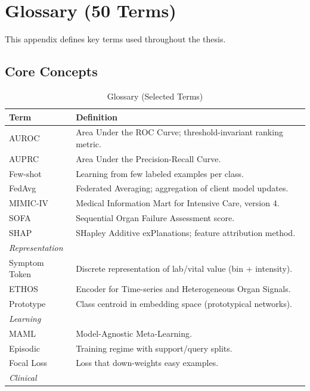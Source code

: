 \chapter{Glossary (50 Terms)}
\label{app:glossary}

This appendix defines key terms used throughout the thesis.

\section{Core Concepts}

\begin{table}[h]
\centering
\caption{Glossary (Selected Terms)}
\begin{tabular}{ll}
\toprule
Term & Definition \\
\midrule
AUROC & Area Under the ROC Curve; threshold-invariant ranking metric. \\
AUPRC & Area Under the Precision-Recall Curve. \\
Few-shot & Learning from few labeled examples per class. \\
FedAvg & Federated Averaging; aggregation of client model updates. \\
MIMIC-IV & Medical Information Mart for Intensive Care, version 4. \\
SOFA & Sequential Organ Failure Assessment score. \\
SHAP & SHapley Additive exPlanations; feature attribution method. \\
\midrule
\multicolumn{2}{l}{\textit{Representation}} \\
\midrule
Symptom Token & Discrete representation of lab/vital value (bin + intensity). \\
ETHOS & Encoder for Time-series and Heterogeneous Organ Signals. \\
Prototype & Class centroid in embedding space (prototypical networks). \\
\midrule
\multicolumn{2}{l}{\textit{Learning}} \\
\midrule
MAML & Model-Agnostic Meta-Learning. \\
Episodic & Training regime with support/query splits. \\
Focal Loss & Loss that down-weights easy examples. \\
\midrule
\multicolumn{2}{l}{\textit{Clinical}} \\

\end{tabular}
\end{table}
